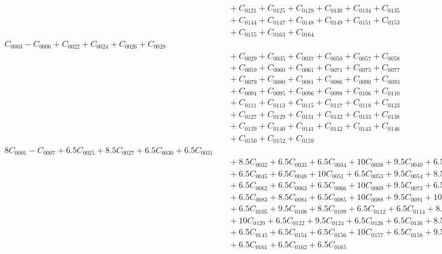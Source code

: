 \documentclass[a4paper,10pt]{article}
\begin{document}
{\begin{align}
&\quad  + C_{0121} + C_{0125} + C_{0128} + C_{0130} + C_{0134} + C_{0135} \\[0.5ex]
&\quad  + C_{0144} + C_{0147} + C_{0148} + C_{0149} + C_{0151} + C_{0153} \\[0.5ex]
&\quad  + C_{0155} + C_{0163} + C_{0164} &= 0 && \text{(R0005)} \\
C_{0003} - C_{0006} + C_{0022} + C_{0024} + C_{0026} + C_{0028} \\[0.5ex]
&\quad  + C_{0029} + C_{0035} + C_{0037} + C_{0050} + C_{0057} + C_{0058} \\[0.5ex]
&\quad  + C_{0059} + C_{0060} + C_{0061} + C_{0071} + C_{0075} + C_{0077} \\[0.5ex]
&\quad  + C_{0079} + C_{0080} + C_{0081} + C_{0086} + C_{0090} + C_{0093} \\[0.5ex]
&\quad  + C_{0094} + C_{0095} + C_{0096} + C_{0098} + C_{0106} + C_{0110} \\[0.5ex]
&\quad  + C_{0111} + C_{0113} + C_{0115} + C_{0117} + C_{0118} + C_{0123} \\[0.5ex]
&\quad  + C_{0127} + C_{0129} + C_{0131} + C_{0132} + C_{0133} + C_{0138} \\[0.5ex]
&\quad  + C_{0139} + C_{0140} + C_{0141} + C_{0142} + C_{0143} + C_{0146} \\[0.5ex]
&\quad  + C_{0150} + C_{0152} + C_{0159} &= 0 && \text{(R0006)} \\
8C_{0001} - C_{0007} + 6.5C_{0025} + 8.5C_{0027} + 6.5C_{0030} + 6.5C_{0031} \\[0.5ex]
&\quad  + 8.5C_{0032} + 6.5C_{0033} + 6.5C_{0034} + 10C_{0038} + 9.5C_{0040} + 6.5C_{0044} \\[0.5ex]
&\quad  + 6.5C_{0045} + 6.5C_{0048} + 10C_{0051} + 6.5C_{0053} + 9.5C_{0054} + 8.5C_{0056} \\[0.5ex]
&\quad  + 6.5C_{0062} + 6.5C_{0063} + 6.5C_{0066} + 10C_{0069} + 9.5C_{0073} + 6.5C_{0082} \\[0.5ex]
&\quad  + 6.5C_{0083} + 8.5C_{0084} + 6.5C_{0085} + 10C_{0088} + 9.5C_{0091} + 10C_{0104} \\[0.5ex]
&\quad  + 6.5C_{0105} + 9.5C_{0108} + 8.5C_{0109} + 6.5C_{0112} + 6.5C_{0114} + 8.5C_{0116} \\[0.5ex]
&\quad  + 10C_{0120} + 6.5C_{0122} + 9.5C_{0124} + 6.5C_{0126} + 6.5C_{0136} + 8.5C_{0137} \\[0.5ex]
&\quad  + 6.5C_{0145} + 6.5C_{0154} + 6.5C_{0156} + 10C_{0157} + 6.5C_{0158} + 9.5C_{0160} \\[0.5ex]
&\quad  + 6.5C_{0161} + 6.5C_{0162} + 6.5C_{0165} &= 0 && \text{(R0007)} \\

\end{align}}
\end{document}
